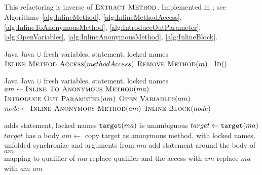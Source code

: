 \subsection{}
This refactoring is inverse of $\textsc{Extract Method}$. Implemented in ; 
see Algorithms~\ref{alg:InlineMethod}, \ref{alg:InlineMethodAccess}, \ref{alg:InlineToAnonymousMethod}, %
\ref{alg:IntroduceOutParameter}, %
\ref{alg:OpenVariables}, \ref{alg:InlineAnonymousMethod}, \ref{alg:InlineBlock}.


\begin{algorithm}[p]
\caption{$\refactoring{Inline Method}(m \colon \type{Method})$}
\label{alg:InlineMethod}
\begin{algorithmic}[1]
\REQUIRE Java
\ENSURE Java $\cup$ fresh variables,  statement, locked names
\medskip
    \STATE $\textsc{Inline Method Access}(methodAccess)$
  \ENDFOR
  \STATE $\textsc{Remove Method}(m)$ \orelse\ $\textsc{Id}()$
\end{algorithmic}
\end{algorithm}


\begin{algorithm}[p]
\caption{$\refactoring{Inline Method Access}(ma \colon \type{MethodAccess})$}
\label{alg:InlineMethodAccess}
\begin{algorithmic}[1]
\REQUIRE Java
\ENSURE Java $\cup$ fresh variables,  statement, locked names
\medskip
  \STATE $am \leftarrow \textsc{Inline To Anonymous Method}(ma)$
  \STATE $\textsc{Introduce Out Parameter}(am)$
  \STATE $\textsc{Open Variables}(am)$
  \STATE $node \leftarrow \textsc{Inline Anonymous Method}(am)$
    \STATE $\textsc{Inline Block}(node)$
  \ENDIF
\end{algorithmic}
\end{algorithm}


\begin{algorithm}[p]
\caption{$\refactoring{Inline To Anonymous Method}(am \colon \type{MethodAccess}) : \type{AnonymousMethod}$}
\label{alg:InlineToAnonymousMethod}
\begin{algorithmic}[1]
\REQUIRE
\ENSURE adds  statement, locked names
\medskip
  \STATE \assert $\text{\texttt{target}}(ma)$ is unambiguous
  \STATE $target \leftarrow \text{\texttt{target}}(ma)$
  \STATE \assert $target$ has a body
  \STATE $am \leftarrow$ copy target as anonymous method, with locked names, 
  			unfolded synchronize and arguments from $ma$
    \STATE add  statement around the body of $am$ \\ mapping  to qualifier of $ma$
    \STATE replace qualifier and the access with $am$
  \ELSE
    \STATE replace $ma$ with $am$
  \ENDIF
  \RETURN $am$
\end{algorithmic}
\end{algorithm}

